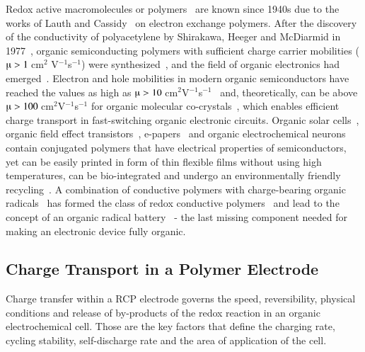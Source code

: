 Redox active macromolecules or polymers~\cite{Staudinger_1920} are known since 1940s due to the works of Lauth and Cassidy~\cite{Cassidy_1949} on electron exchange polymers. After the discovery of the conductivity of polyacetylene by Shirakawa, Heeger and McDiarmid in 1977~\cite{Shirakawa_1977}, organic semiconducting polymers with sufficient charge carrier mobilities ($\muup>1~$cm$^2$ V$^{-1}$s$^{-1}$) were synthesized~\cite{Hu2021}, and the field of organic electronics had emerged~\cite{heeger_polymers,Casado_2021_book}. Electron and hole mobilities in modern organic semiconductors have reached the values as high as $\muup>10~$cm$^2$V$^{-1}$s$^{-1}$~\cite{Hu2021} and, theoretically, can be above $\muup>100~$cm$^2$V$^{-1}$s$^{-1}$ for organic molecular co-crystals~\cite{Zhu2012}, which enables efficient charge transport in fast-switching organic electronic circuits. Organic solar cells~\cite{Lee_1993}, organic field effect transistors~\cite{Koezuka_1987,Yan2009}, e-papers~\cite{Hu2021} and organic electrochemical neurons~\cite{Harikesh2022} contain conjugated polymers that have electrical properties of semiconductors, yet can be easily printed in form of thin flexible films without using high temperatures, can be bio-integrated and undergo an environmentally friendly recycling~\cite{nishide_2009}. A combination of conductive polymers with charge-bearing organic radicals~\cite{IWASA2007} has formed the class of redox conductive polymers~\cite{Casado_2021_book} and lead to the concept of an organic radical battery~\cite{Rohland_2021,nishide2004_electact,nakahara2002_cpl,Xie2021} - the last missing component needed for making an electronic device fully organic.\\



\subsection{Charge Transport in a Polymer Electrode}  

\par
Charge transfer within a RCP electrode governs the speed, reversibility, physical conditions and release of by-products of the redox reaction in an organic electrochemical cell. Those are the key factors that define the charging rate, cycling stability, self-discharge rate and the area of application of the cell.\\

